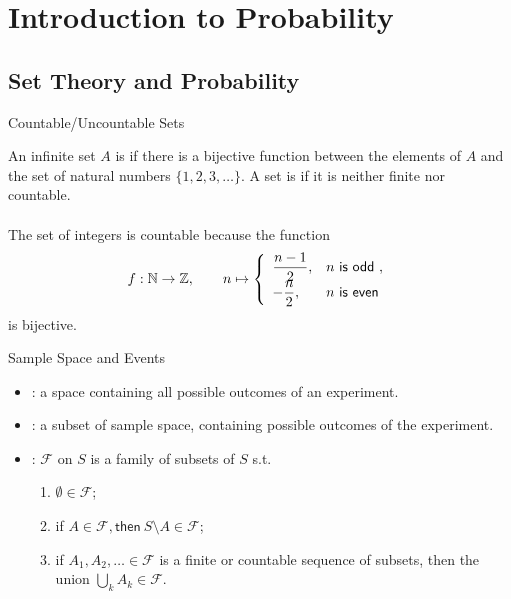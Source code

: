\section{Introduction to Probability}

\subsection{Set Theory and Probability}

\begin{frame}{Countable/Uncountable Sets}

\justifying
{} An infinite set $A$ is  if there is a bijective function between the elements of $A$ and the set of natural numbers $\{1, 2, 3, \ldots\}$. A set is  if it is neither finite nor countable.
~\\
~\\
\justifying
{} The set of integers is countable because the function
\begin{align*}
f: \mathbb{N}\rightarrow \mathbb{Z}, \qquad n\mapsto \left\{
\begin{array}{ll}
\dfrac{n-1}{2}, & n\mathsf{\ is\ odd\ }, \\
-\dfrac{n}{2}, & n\mathsf{\ is\ even\ }
\end{array}
\right.
\end{align*}
is bijective.

\end{frame}

\begin{frame}{Sample Space and Events}

\begin{itemize}
	\justifying
	\item {}: a space containing all possible outcomes of an experiment.
	\item {}: a subset of sample space, containing possible outcomes of the experiment.
	\item {}: $\mathcal{F}$ on $S$ is a family of subsets of $S$ s.t.
	\begin{enumerate}
		\justifying
		\item $\emptyset\in \mathcal{F}$;
		\item if $A\in \mathcal{F}, \mathsf{then\ } S\setminus A \in \mathcal{F}$;
		\item if $A_1, A_2, \ldots \in \mathcal{F}$ is a finite or countable sequence of subsets, then the union $\bigcup_k A_k\in \mathcal{F}$.
	\end{enumerate}
\end{itemize}

\end{frame}

